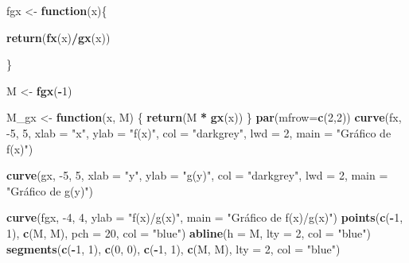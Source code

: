 \documentclass[11pt,]{article}
\newenvironment{Shaded}{\begin{snugshade}}{\end{snugshade}}
\newcommand{\ControlFlowTok}[1]{\textcolor[rgb]{0.13,0.29,0.53}{\textbf{#1}}}
\newcommand{\DataTypeTok}[1]{\textcolor[rgb]{0.13,0.29,0.53}{#1}}
\newcommand{\DecValTok}[1]{\textcolor[rgb]{0.00,0.00,0.81}{#1}}
\newcommand{\KeywordTok}[1]{\textcolor[rgb]{0.13,0.29,0.53}{\textbf{#1}}}
\newcommand{\NormalTok}[1]{#1}
\newcommand{\OperatorTok}[1]{\textcolor[rgb]{0.81,0.36,0.00}{\textbf{#1}}}
\newcommand{\StringTok}[1]{\textcolor[rgb]{0.31,0.60,0.02}{#1}}
\begin{document}
\begin{Shaded}
\begin{Highlighting}[]
\NormalTok{fgx <-}\StringTok{ }\ControlFlowTok{function}\NormalTok{(x)\{}

  \KeywordTok{return}\NormalTok{(}\KeywordTok{fx}\NormalTok{(x)}\OperatorTok{/}\KeywordTok{gx}\NormalTok{(x))}

\NormalTok{\}}

\NormalTok{M <-}\StringTok{ }\KeywordTok{fgx}\NormalTok{(}\OperatorTok{-}\DecValTok{1}\NormalTok{)}



\NormalTok{M_gx <-}\StringTok{ }\ControlFlowTok{function}\NormalTok{(x, M) \{}
  \KeywordTok{return}\NormalTok{(M }\OperatorTok{*}\StringTok{ }\KeywordTok{gx}\NormalTok{(x))}
\NormalTok{\}}
\KeywordTok{par}\NormalTok{(}\DataTypeTok{mfrow=}\KeywordTok{c}\NormalTok{(}\DecValTok{2}\NormalTok{,}\DecValTok{2}\NormalTok{))}
\KeywordTok{curve}\NormalTok{(fx, }\DecValTok{-5}\NormalTok{, }\DecValTok{5}\NormalTok{, }\DataTypeTok{xlab =} \StringTok{"x"}\NormalTok{, }\DataTypeTok{ylab =} \StringTok{"f(x)"}\NormalTok{,}
      \DataTypeTok{col =} \StringTok{"darkgrey"}\NormalTok{, }\DataTypeTok{lwd =} \DecValTok{2}\NormalTok{, }\DataTypeTok{main =} \StringTok{"Gráfico de f(x)"}\NormalTok{)}

\KeywordTok{curve}\NormalTok{(gx, }\DecValTok{-5}\NormalTok{, }\DecValTok{5}\NormalTok{, }\DataTypeTok{xlab =} \StringTok{"y"}\NormalTok{, }\DataTypeTok{ylab =} \StringTok{"g(y)"}\NormalTok{,}
      \DataTypeTok{col =} \StringTok{"darkgrey"}\NormalTok{, }\DataTypeTok{lwd =} \DecValTok{2}\NormalTok{, }\DataTypeTok{main =} \StringTok{"Gráfico de g(y)"}\NormalTok{)}

\KeywordTok{curve}\NormalTok{(fgx, }\DecValTok{-4}\NormalTok{, }\DecValTok{4}\NormalTok{, }\DataTypeTok{ylab =} \StringTok{"f(x)/g(x)"}\NormalTok{, }\DataTypeTok{main =} \StringTok{"Gráfico de f(x)/g(x)"}\NormalTok{)}
\KeywordTok{points}\NormalTok{(}\KeywordTok{c}\NormalTok{(}\OperatorTok{-}\DecValTok{1}\NormalTok{, }\DecValTok{1}\NormalTok{), }\KeywordTok{c}\NormalTok{(M, M), }\DataTypeTok{pch =} \DecValTok{20}\NormalTok{, }\DataTypeTok{col =} \StringTok{"blue"}\NormalTok{)}
\KeywordTok{abline}\NormalTok{(}\DataTypeTok{h =}\NormalTok{ M, }\DataTypeTok{lty =} \DecValTok{2}\NormalTok{, }\DataTypeTok{col =} \StringTok{"blue"}\NormalTok{)}
\KeywordTok{segments}\NormalTok{(}\KeywordTok{c}\NormalTok{(}\OperatorTok{-}\DecValTok{1}\NormalTok{, }\DecValTok{1}\NormalTok{), }\KeywordTok{c}\NormalTok{(}\DecValTok{0}\NormalTok{, }\DecValTok{0}\NormalTok{), }\KeywordTok{c}\NormalTok{(}\OperatorTok{-}\DecValTok{1}\NormalTok{, }\DecValTok{1}\NormalTok{), }\KeywordTok{c}\NormalTok{(M, M), }\DataTypeTok{lty =} \DecValTok{2}\NormalTok{, }\DataTypeTok{col =} \StringTok{"blue"}\NormalTok{)}


\end{Highlighting}
\end{Shaded}
\end{document}
